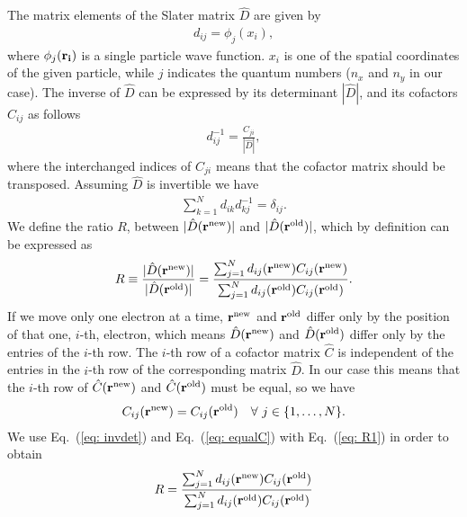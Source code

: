 \documentclass[../main.tex]{subfiles}
\begin{document}
\begin{appendices}
The matrix elements of the Slater matrix $\hat{D}$ are given by 
\begin{align}
    d_{ij} = \phi_j(x_i),
\end{align}
where $\phi_j({\bf r_i})$ is a single particle wave function. $x_i$ is one of the spatial coordinates of the given particle, while $j$ indicates the quantum numbers ($n_x$ and $n_y$ in our case).
The inverse of $\hat{D}$ can be expressed by its determinant $|\hat{D}|$, and its cofactors $C_{ij}$ as follows
\begin{align}\label{eq: invdet}
    d_{ij}^{-1} = \frac{C_{ji}}{|\hat{D}|}, 
\end{align}
where the interchanged indices of $C_{ji}$ means that the cofactor matrix should be transposed. Assuming $\hat{D}$ is invertible we have
\begin{align}\label{eq: unity}
    \sum_{k=1}^N d_{ik}d_{kj}^{-1} = \delta_{ij}.
\end{align}
We define the ratio $R$, between $|\hat{D}({\bf r}^{\textrm{new}})|$ and $|\hat{D}({\bf r}^{\textrm{old}})|$, which by definition can be expressed as
\begin{align}\label{eq: R1}
    R \equiv \frac{|\hat{D}({\bf r}^{\textrm{new}})|}{|\hat{D}({\bf r}^{\textrm{old}})|} 
    = \frac{\sum_{j=1}^N d_{ij}({\bf r}^{\textrm{new}}) C_{ij}({\bf r}^{\textrm{new}})}{\sum_{j=1}^N d_{ij}({\bf r}^{\textrm{old}}) C_{ij}({\bf r}^{\textrm{old}})}.
\end{align}
If we move only one electron at a time, ${\bf r}^{\textrm{new}}$ and ${\bf r}^{\textrm{old}}$ differ only by the position of that one, $i$-th, electron, which means $\hat{D}({\bf r}^{\textrm{new}})$ and $\hat{D}({\bf r}^{\textrm{old}})$ differ only by the entries of the $i$-th row. The $i$-th row of a cofactor matrix $\hat{C}$ is independent of the entries in the $i$-th row of the corresponding matrix $\hat{D}$. In our case this means that the $i$-th row of $\hat{C}({\bf r}^{\textrm{new}})$ and $\hat{C}({\bf r}^{\textrm{old}})$ must be equal, so we have 
\begin{align}\label{eq: equalC}
    C_{ij}({\bf r}^{\textrm{new}}) = C_{ij}({\bf r}^{\textrm{old}})\quad \forall \ j \in \{1, \dots, N\}.
\end{align}
We use Eq.~(\ref{eq: invdet}) and Eq.~(\ref{eq: equalC}) with Eq.~(\ref{eq: R1}) in order to obtain
\begin{align}
    R = \frac{\sum_{j=1}^N d_{ij}({\bf r}^{\textrm{new}}) C_{ij}({\bf r}^{\textrm{old}})}{\sum_{j=1}^N d_{ij}({\bf r}^{\textrm{old}}) C_{ij}({\bf r}^{\textrm{old}})} 

\end{align}
\end{appendices}
\end{document}
